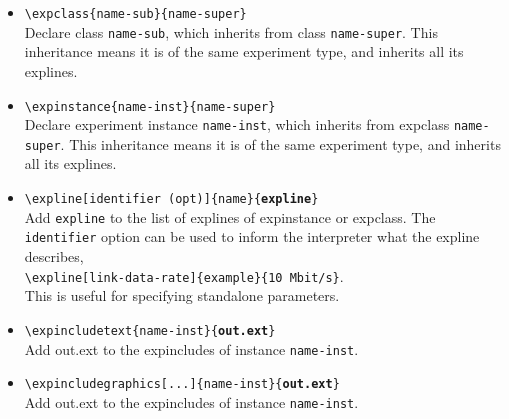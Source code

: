 \begin{itemize}[leftmargin=12pt,itemsep=2pt,topsep=2pt]
    \item \texttt{\textbackslash expclass\{name-sub\}\{name-super\}}\vspace{0.05cm}\\
          Declare class \texttt{name-sub}, which inherits from class \texttt{name-super}. This inheritance means it is of the same experiment type, and inherits all its explines.
          \vspace{0.1cm}
    \item \texttt{\textbackslash expinstance\{name-inst\}\{name-super\}}\vspace{0.05cm}\\
          Declare experiment instance \texttt{name-inst}, which inherits from expclass \texttt{name-super}. This inheritance means it is of the same experiment type, and inherits all its explines.
          \vspace{0.1cm}
    \item \texttt{\textbackslash expline[identifier (opt)]\{name\}\{\textbf{expline}\}}\vspace{0.05cm}\\
          Add \texttt{expline} to the list of explines of expinstance or expclass. The \texttt{identifier} option can be used to inform the interpreter what the expline describes, \eg \\ \texttt{\textbackslash expline[link-data-rate]\{example\}\{10~Mbit/s\}}.\\ This is useful for specifying standalone parameters.
          \vspace{0.1cm}
    \item \texttt{\textbackslash expincludetext\{name-inst\}\{\textbf{out.ext}\}}\vspace{0.05cm}\\
          Add out.ext to the expincludes of instance \texttt{name-inst}.
          \vspace{0.1cm}
    \item \texttt{\textbackslash expincludegraphics[...]\{name-inst\}\{\textbf{out.ext}\}}\vspace{0.05cm}\\
          Add out.ext to the expincludes of instance \texttt{name-inst}.\vspace{0.1cm}
\end{itemize}

